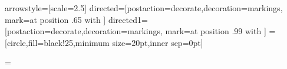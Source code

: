 \usepackage[framemethod=tikz]{mdframed}

\usepackage{emptypage}

\usepackage{rotating}
\usepackage{tikz}
\usetikzlibrary{calc,intersections,shapes.callouts}
\usetikzlibrary{decorations.text}
\usetikzlibrary{positioning}
\usetikzlibrary{decorations.pathreplacing}
\usetikzlibrary{shadows}
\usetikzlibrary{backgrounds}
\usepackage{circuitikz}
\tikzstyle arrowstyle=[scale=2.5]
\tikzstyle directed=[postaction={decorate,decoration={markings,
    mark=at position .65 with {}}}]
\tikzstyle directed1=[postaction={decorate,decoration={markings,
    mark=at position .99 with {}}}]   
=[circle,fill=black!25,minimum size=20pt,inner sep=0pt]


\pdfpageheight=\paperheight 

\usepackage{pgfplots}
\usepackage{pgfplotstable}

\usepackage{fancyhdr}

\usepackage{answers}

\usepackage[explicit,sc,nobottomtitles]{titlesec}





\usepackage{aFirstCourseLinearAlgebra/LyryxMathStyle}

\usepackage{aFirstCourseLinearAlgebra/LyryxLinAlgStyle}

\let\origcedilla\c
\renewcommand{\b}{\mathbf{b}}
\renewcommand{\x}{\mathbf{x}}
\renewcommand{\c}{\mathbf{c}}
\renewcommand{\0}{\mathbf{0}}
\renewcommand{\u}{\mathbf{u}}

